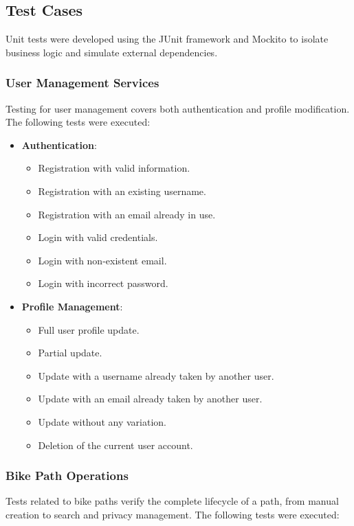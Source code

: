 \subsection{Test Cases}
Unit tests were developed using the JUnit framework and Mockito to isolate business logic and simulate external dependencies.

\subsubsection{User Management Services}
Testing for user management covers both authentication and profile modification. The following tests were executed:

\begin{itemize}
    \item \textbf{Authentication}:
    \begin{itemize}
        \item Registration with valid information.
        \item Registration with an existing username.
        \item Registration with an email already in use.
        \item Login with valid credentials.
        \item Login with non-existent email.
        \item Login with incorrect password.
    \end{itemize}
    
    \item \textbf{Profile Management}:
    \begin{itemize}
        \item Full user profile update.
        \item Partial update.
        \item Update with a username already taken by another user.
        \item Update with an email already taken by another user.
        \item Update without any variation.
        \item Deletion of the current user account.
    \end{itemize}
\end{itemize}

\subsubsection{Bike Path Operations}
Tests related to bike paths verify the complete lifecycle of a path, from manual creation to search and privacy management. The following tests were executed:

